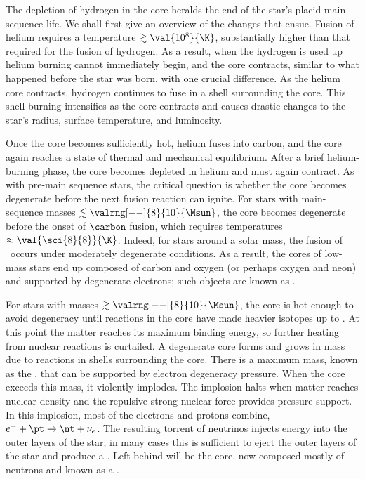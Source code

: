 
The depletion of hydrogen in the core heralds the end of the star's placid main-sequence life. We shall first give an overview of the changes that ensue. Fusion of helium requires a temperature $\gtrsim\val{10^{8}}{\K}$, substantially higher than that required for the fusion of hydrogen. As a result, when the hydrogen is used up helium burning cannot immediately begin, and the core contracts, similar to what happened before the star was born, with one crucial difference. As the helium core contracts, hydrogen continues to fuse in a shell surrounding the core. This shell burning intensifies as the core contracts and causes drastic changes to the star's radius, surface temperature, and luminosity.

Once the core becomes sufficiently hot, helium fuses into carbon, and the core again reaches a state of thermal and mechanical equilibrium. After a brief helium-burning phase, the core becomes depleted in helium and must again contract. As with pre-main sequence stars, the critical question is whether the core becomes degenerate before the next fusion reaction can ignite. For stars with main-sequence masses $\lesssim \valrng[--]{8}{10}{\Msun}$, the core becomes degenerate before the onset of $\carbon$ fusion, which requires temperatures $\approx\val{\sci{8}{8}}{\K}$.  Indeed, for stars around a solar mass, the fusion of \helium\ occurs under moderately degenerate conditions.
As a result, the cores of low-mass stars end up composed of carbon and oxygen (or perhaps oxygen and neon) and supported by degenerate electrons; such objects are known as .

For stars with masses $\gtrsim\valrng[--]{8}{10}{\Msun}$, the core is hot enough to avoid degeneracy until reactions in the core have made heavier isotopes up to \iron. At this point the matter reaches its maximum binding energy, so further heating from nuclear reactions is curtailed. A degenerate core forms and grows in mass due to reactions in shells surrounding the core. There is a maximum mass, known as the , that can be supported by electron degeneracy pressure. When the core exceeds this mass, it violently implodes. The implosion halts when matter reaches nuclear density and the repulsive strong nuclear force provides pressure support. In this implosion, most of the electrons and protons combine, $e^{-} + \pt \to \nt+\nu_{e}$. 
The resulting torrent of neutrinos injects energy into the outer layers of the star; in many cases this is sufficient to eject the outer layers of the star and produce a . Left behind will be the core, now composed mostly of neutrons and known as a .

